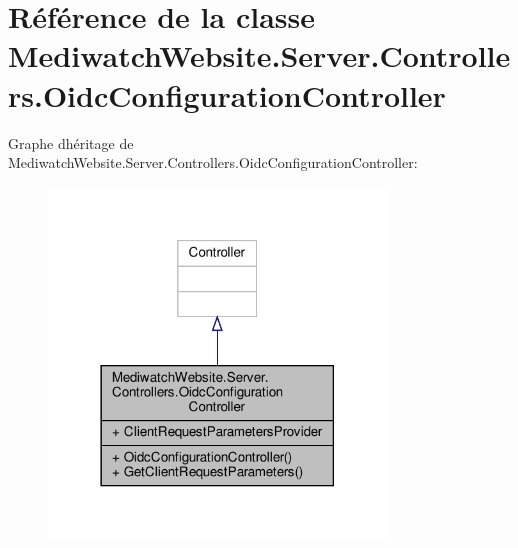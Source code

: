 \hypertarget{class_mediwatch_website_1_1_server_1_1_controllers_1_1_oidc_configuration_controller}{}\section{Référence de la classe Mediwatch\+Website.\+Server.\+Controllers.\+Oidc\+Configuration\+Controller}
\label{class_mediwatch_website_1_1_server_1_1_controllers_1_1_oidc_configuration_controller}


Graphe d\textquotesingle{}héritage de Mediwatch\+Website.\+Server.\+Controllers.\+Oidc\+Configuration\+Controller\+:
\nopagebreak
\begin{figure}[H]
\begin{center}
\leavevmode
\includegraphics[width=254pt]{class_mediwatch_website_1_1_server_1_1_controllers_1_1_oidc_configuration_controller__inherit__graph}
\end{center}
\end{figure}


